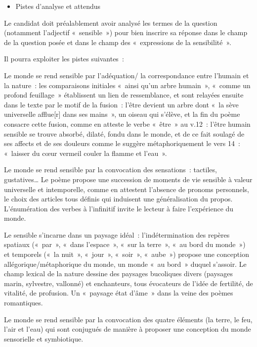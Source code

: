 {\begin{itemize}[label=\textbullet]
\item Pistes d'analyse et attendus
\end{itemize}

Le candidat doit préalablement avoir analysé les termes de la question (notamment
l'adjectif «~sensible~») pour bien inscrire sa réponse dans le champ de la question
posée et dans le champ des «~expressions de la sensibilité~».

Il pourra exploiter les pistes suivantes~:

Le monde se rend sensible par l'adéquation/ la correspondance entre l'humain et la
nature~: les comparaisons initiales «~ainsi qu'un arbre humain~», «~comme un profond
feuillage~» établissent un lien de ressemblance, et sont relayées ensuite dans le texte
par le motif de la fusion~: l'être devient un arbre dont «~la sève universelle afflue[r] dans
ses mains~», un oiseau qui s'élève, et la fin du poème consacre cette fusion, comme
en atteste le verbe «~être~» au v.12~: l'être humain sensible se trouve absorbé, dilaté,
fondu dans le monde, et de ce fait soulagé de ses affects et de ses douleurs comme
le suggère métaphoriquement le vers 14~: «~laisser du cœur vermeil couler la flamme
et l'eau~».

Le monde se rend sensible par la convocation des sensations~: tactiles, gustatives…
Le poème propose une succession de moments de vie sensible à valeur universelle et
intemporelle, comme en attestent l'absence de pronoms personnels, le choix des
articles tous définis qui induisent une généralisation du propos. L'énumération des
verbes à l'infinitif invite le lecteur à faire l'expérience du monde.

Le sensible s'incarne dans un paysage idéal~: l'indétermination des repères spatiaux
(«~par~», «~dans l'espace~», «~sur la terre~», «~au bord du monde~») et temporels («~la
nuit~», «~jour~», «~soir~», «~aube~») propose une conception allégorique/métaphorique
du monde, un monde «~au bord~» duquel s'assoir. Le champ lexical de la nature
dessine des paysages bucoliques divers (paysages marin, sylvestre, vallonné) et
enchanteurs, tous évocateurs de l'idée de fertilité, de vitalité, de profusion. Un
«~paysage état d'âme~» dans la veine des poèmes romantiques.

Le monde se rend sensible par la convocation des quatre éléments (la terre, le feu,
l'air et l'eau) qui sont conjugués de manière à proposer une conception du monde
sensorielle et symbiotique.

}
